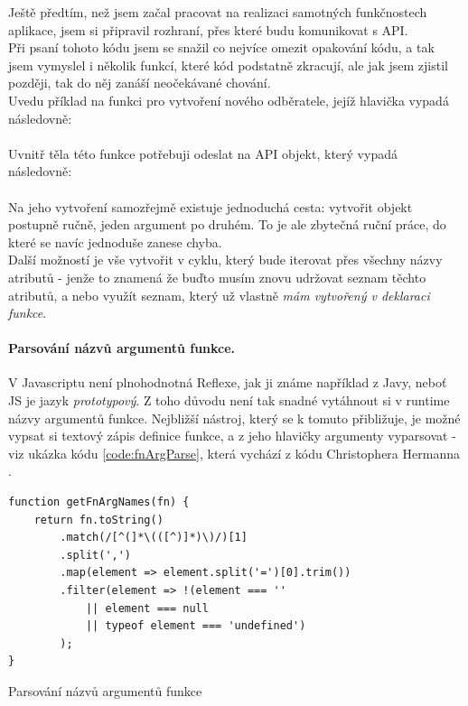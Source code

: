 Ještě předtím, než jsem začal pracovat na realizaci samotných funkčnostech aplikace, jsem si připravil rozhraní, přes které budu komunikovat s API.\\
Při psaní tohoto kódu jsem se snažil co nejvíce omezit opakování kódu, a tak jsem vymyslel i několik funkcí, které kód podstatně zkracují, ale jak jsem zjistil později, tak do něj zanáší neočekávané chování.\\
Uvedu příklad na funkci pro vytvoření nového odběratele, jejíž hlavička vypadá následovně:\\
\\
Uvnitř těla této funkce potřebuji odeslat na API objekt, který vypadá následovně:\\
\\
Na jeho vytvoření samozřejmě existuje jednoduchá cesta: vytvořit objekt postupně ručně, jeden argument po druhém. To je ale zbytečná ruční práce, do které se navíc jednoduše zanese chyba.\\
Další možností je vše vytvořit v cyklu, který bude iterovat přes všechny názvy atributů - jenže to znamená že buďto musím znovu udržovat seznam těchto atributů, a nebo využít seznam, který už vlastně \emph{mám vytvořený v deklaraci funkce}.\\

\paragraph{Parsování názvů argumentů funkce.} V Javascriptu není plnohodnotná Reflexe, jak ji známe například z Javy, neboť JS je jazyk \emph{prototypový}. Z toho důvodu není tak snadné vytáhnout si v runtime názvy argumentů funkce. Nejbližší nástroj, který se k tomuto přibližuje, je možné vypsat si textový zápis definice funkce, a z jeho hlavičky argumenty vyparsovat - viz ukázka kódu \ref{code:fnArgParse}, která vychází z kódu Christophera Hermanna \cite{fn-parse}.

\begin{listing}[h]
\begin{verbatim}
function getFnArgNames(fn) {
    return fn.toString()
        .match(/[^(]*\(([^)]*)\)/)[1]
        .split(',')
        .map(element => element.split('=')[0].trim())
        .filter(element => !(element === '' 
            || element === null 
            || typeof element === 'undefined')
        );
}
\end{verbatim}
\caption{Parsování názvů argumentů funkce} \label{code:fnArgParse}
\end{listing}

